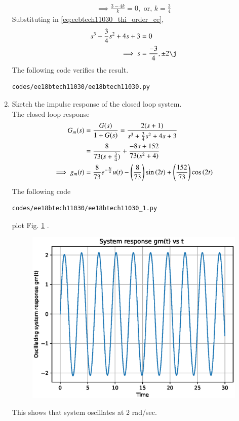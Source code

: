 \begin{enumerate}[label=\thesubsection.\arabic*.,ref=\thesubsection.\theenumi]
\begin{align}
\implies \frac{3-4k}{k} = 0, \text{ or, }  k = \frac{3}{4}
\end{align}
Substituting in \eqref{eq:eebtech11030_thi_order_ce},
\begin{align} 
s^3+\frac{3}{4}s^2+4s+3 &= 0
\\
\implies  s &= \frac{-3}{4},\pm 2\j
\end{align}
%
The following code verifies the result.
\begin{lstlisting}
codes/ee18btech11030/ee18btech11030.py
\end{lstlisting}

\item Sketch the impulse response of the closed loop system.
\\
\solution The closed loop response
\begin{align}
 G_{m}(s) &= \frac{G(s)}{1+G(s)}=\frac{2(s+1)}{s^3+\frac{3}{4}s^2+4s+3} 
\\
 &= \frac{8}{73(s+\frac{3}{4})}+ \frac{-8s+152}{73(s^2+4)}
\\
 \implies g_{m}(t) &= \frac{8}{73}e^{-\frac{3t}{4}}u(t)- \left(\frac{8}{73}\right)\sin\left(2t\right) +\left(\frac{152}{73}\right)\cos\left(2t\right)
\end{align}
%
The following code 
\begin{lstlisting}
codes/ee18btech11030/ee18btech11030_1.py
\end{lstlisting}
plot Fig. \ref{fig:ee18btech11030_sine} .
%
\begin{figure}[!h]
\centering
  \includegraphics[width=\columnwidth]{./figs/ee18btech11030/ee18btech11030_1.eps}
\caption{}
\label{fig:ee18btech11030_sine} 
\end{figure}
%
This shows that system oscillates at 2 rad/sec.
\end{enumerate}
